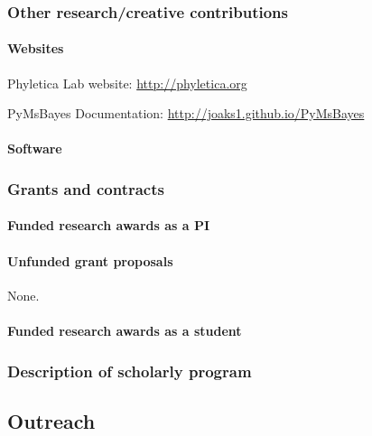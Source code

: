 \subsubsection{Other research/creative contributions}
 
\paragraph{Websites}
\begin{tightItemize}
    \item Phyletica Lab website: \url{http://phyletica.org}
    \item PyMsBayes Documentation: \url{http://joaks1.github.io/PyMsBayes}
\end{tightItemize}

\paragraph{Software}


\subsubsection{Grants and contracts}

\paragraph{Funded research awards as a PI}


\paragraph{Unfunded grant proposals}
None.

\paragraph{Funded research awards as a student}


\subsubsection{Description of scholarly program}


\subsection{Outreach}


